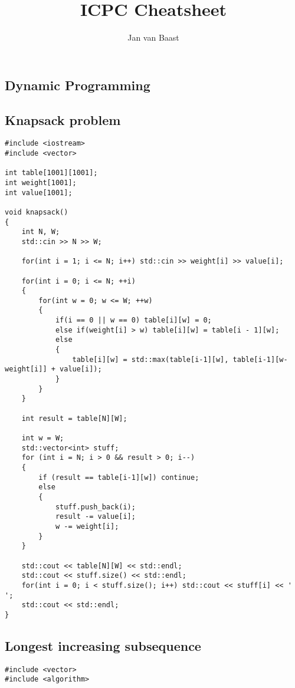 \documentclass[10pt,a4paper,landscape,twosided]{extarticle}
\begin{document}
\title{ICPC Cheatsheet}
\author{Jan van Baast}
\maketitle
\begin{multicols}{2}

\tableofcontents
{}
\section{Dynamic Programming}

\subsection{Knapsack problem}
\begin{lstlisting}
#include <iostream>
#include <vector>

int table[1001][1001];
int weight[1001];
int value[1001];

void knapsack()
{
    int N, W;
    std::cin >> N >> W;

    for(int i = 1; i <= N; i++) std::cin >> weight[i] >> value[i];

    for(int i = 0; i <= N; ++i)
    {
        for(int w = 0; w <= W; ++w)
        {
            if(i == 0 || w == 0) table[i][w] = 0;
            else if(weight[i] > w) table[i][w] = table[i - 1][w];
            else
            {
                table[i][w] = std::max(table[i-1][w], table[i-1][w-weight[i]] + value[i]);
            }
        }
    }

    int result = table[N][W];
    
    int w = W;
    std::vector<int> stuff;
    for (int i = N; i > 0 && result > 0; i--) 
    {
        if (result == table[i-1][w]) continue;   
        else 
        {
            stuff.push_back(i);
            result -= value[i];
            w -= weight[i];
        }
    }

    std::cout << table[N][W] << std::endl;
    std::cout << stuff.size() << std::endl;
    for(int i = 0; i < stuff.size(); i++) std::cout << stuff[i] << ' ';
    std::cout << std::endl;
}
\end{lstlisting}

\subsection{Longest increasing subsequence}
\begin{lstlisting}
#include <vector>
#include <algorithm>


\end{lstlisting}
\end{multicols}
\end{document}
